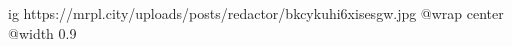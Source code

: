  
 
 
 
 

\ifcmt
  ig https://mrpl.city/uploads/posts/redactor/bkcykuhi6xisesgw.jpg
  @wrap center
  @width 0.9
\fi
